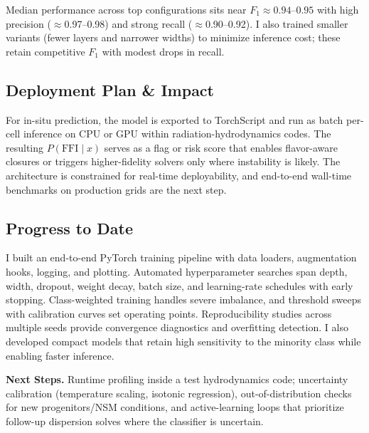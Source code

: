 \documentclass[10pt]{article}
\begin{document}
\begin{center}
Median performance across top configurations sits near $F_1 \approx 0.94$--$0.95$ with high precision ($\approx$0.97--0.98) and strong recall ($\approx$0.90--0.92).
I also trained smaller variants (fewer layers and narrower widths) to minimize inference cost; these retain competitive $F_1$ with modest drops in recall.

\subsection*{Deployment Plan \& Impact}
For in-situ prediction, the model is exported to TorchScript and run as batch per-cell inference on CPU or GPU within radiation-hydrodynamics codes.
The resulting $P(\mathrm{FFI}\mid x)$ serves as a flag or risk score that enables flavor-aware closures or triggers higher-fidelity solvers only where instability is likely.
The architecture is constrained for real-time deployability, and end-to-end wall-time benchmarks on production grids are the next step.

\subsection*{Progress to Date}
I built an end-to-end PyTorch training pipeline with data loaders, augmentation hooks, logging, and plotting.
Automated hyperparameter searches span depth, width, dropout, weight decay, batch size, and learning-rate schedules with early stopping.
Class-weighted training handles severe imbalance, and threshold sweeps with calibration curves set operating points.
Reproducibility studies across multiple seeds provide convergence diagnostics and overfitting detection.
I also developed compact models that retain high sensitivity to the minority class while enabling faster inference.

\textbf{Next Steps.}
Runtime profiling inside a test hydrodynamics code; uncertainty calibration (temperature scaling, isotonic regression), out-of-distribution checks for new progenitors/NSM conditions, and active-learning loops that prioritize follow-up dispersion solves where the classifier is uncertain.
\end{center}
\end{document}
